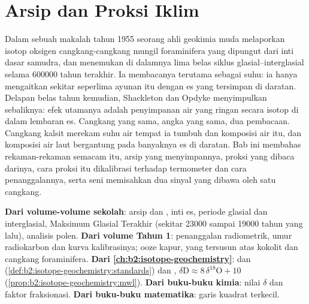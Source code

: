 \chapter{Arsip dan Proksi Iklim}\label{ch:b2:climate-proxies}

Dalam sebuah makalah tahun 1955 seorang ahli geokimia muda melaporkan isotop oksigen cangkang-cangkang mungil
foraminifera yang dipungut dari inti dasar samudra, dan menemukan di dalamnya lima belas siklus glasial--interglasial selama
\num{600000} tahun terakhir. Ia membacanya terutama sebagai suhu: ia hanya mengaitkan sekitar seperlima
ayunan itu dengan es yang tersimpan di daratan. Delapan belas tahun kemudian, Shackleton dan Opdyke menyimpulkan
sebaliknya: efek utamanya adalah penyimpanan air yang ringan secara isotop di dalam lembaran
es. Cangkang yang sama, angka yang sama, dua pembacaan. Cangkang kalsit merekam
suhu air tempat ia tumbuh dan komposisi air itu, dan komposisi
air laut bergantung pada banyaknya es di daratan. Bab ini membahas rekaman-rekaman semacam itu,
arsip yang menyimpannya, proksi yang dibaca darinya, cara proksi itu dikalibrasi terhadap termometer
dan cara penanggalannya, serta seni memisahkan dua sinyal yang dibawa oleh satu cangkang.

\begin{recall}
\textbf{Dari volume-volume sekolah}: arsip dan , inti es, periode glasial dan
interglasial, Maksimum Glasial Terakhir (sekitar \num{23000} sampai \num{19000} tahun yang lalu), analisis
polen. \textbf{Dari volume Tahun 1}: penanggalan radiometrik, umur radiokarbon dan kurva
kalibrasinya; ooze kapur, yang tersusun atas kokolit dan cangkang foraminifera.
\textbf{Dari \cref{ch:b2:isotope-geochemistry}}:   dan 
(\cref{def:b2:isotope-geochemistry:standards}) dan , $\delta\mathrm{D}
\approx 8\,\delta^{18}\mathrm{O} + 10$ (\cref{prop:b2:isotope-geochemistry:mwl}). \textbf{Dari
buku-buku kimia}: nilai $\delta$ dan faktor fraksionasi. \textbf{Dari buku-buku
matematika}: garis kuadrat terkecil.
\end{recall}

